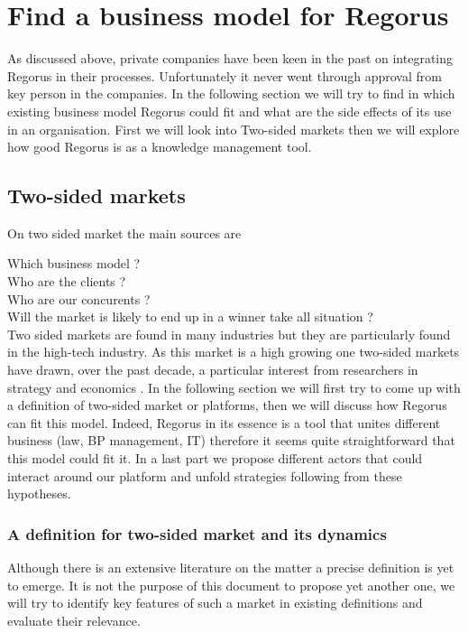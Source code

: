 \documentclass[10pt]{report}
\begin{document}
\section{Find a business model for Regorus}

As discussed above, private companies have been keen in the past on integrating Regorus in their processes. Unfortunately it never went through approval from key person in the companies. In the following section we will try to find in which existing business model Regorus could fit and what are the side effects of its use in an organisation. First we will look into Two-sided markets then we will explore how good Regorus is as a knowledge management tool.

\subsection{Two-sided markets}
On two sided market the main sources are \autocite{ParkerA05} \autocite{eisenmann2006strategies} \autocite{rochet2003platform} \autocite{Hagiu2011} \autocite{economides2006}

Which business model ?\\
Who are the clients ?\\
Who are our concurents ?\\

Will the market is likely to end up in a winner take all situation ?\\

Two sided markets are found in many industries but they are particularly found in the high-tech industry. As this market is a high growing one two-sided markets have drawn, over the past decade, a particular interest from researchers in strategy and economics \autocite{Hagiu2011}. In the following section we will first try to come up with a definition of two-sided market or platforms, then we will discuss how Regorus can fit this model. Indeed, Regorus in its essence is a tool that unites different business (law, BP management, IT) therefore it seems quite straightforward that this model could fit it. In a last part we propose different actors that could interact around our platform and unfold strategies following from these hypotheses.

\subsubsection{A definition for two-sided market and its dynamics}

Although there is an extensive literature on the matter a precise definition is yet to emerge. It is not the purpose of this document to propose yet another one, we will try to identify key features of such a market in existing definitions and evaluate their relevance.
\end{document}
